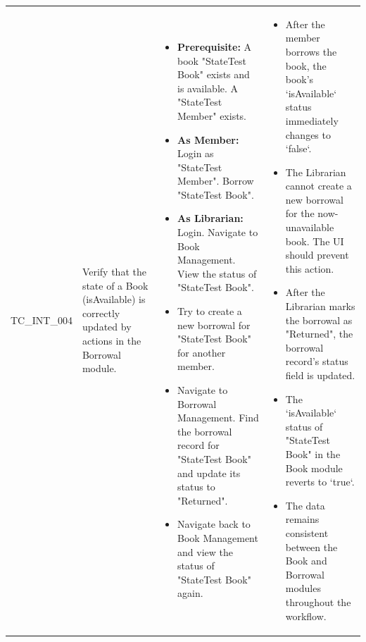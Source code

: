 \begin{longtable}{|>{\scriptsize\raggedright\arraybackslash}p{2cm}|>{\raggedright\arraybackslash}p{4cm}|>{\raggedright\arraybackslash}p{5cm}|>{\raggedright\arraybackslash}p{4.5cm}|}
\multicolumn{4}{|l|}{\textbf{Scenario: State Transitions Across Modules}} \\ \hline
TC\_INT\_004 & Verify that the state of a Book (isAvailable) is correctly updated by actions in the Borrowal module. & 
    \begin{itemize}[noitemsep, topsep=0pt, partopsep=0pt, leftmargin=*]
        \item \textbf{Prerequisite:} A book "StateTest Book" exists and is available. A "StateTest Member" exists.
        \item \textbf{As Member:} Login as "StateTest Member". Borrow "StateTest Book".
        \item \textbf{As Librarian:} Login. Navigate to Book Management. View the status of "StateTest Book".
        \item Try to create a new borrowal for "StateTest Book" for another member.
        \item Navigate to Borrowal Management. Find the borrowal record for "StateTest Book" and update its status to "Returned".
        \item Navigate back to Book Management and view the status of "StateTest Book" again.
    \end{itemize} & 
    \begin{itemize}[noitemsep, topsep=0pt, partopsep=0pt, leftmargin=*]
        \item After the member borrows the book, the book's `isAvailable` status immediately changes to `false`.
        \item The Librarian cannot create a new borrowal for the now-unavailable book. The UI should prevent this action.
        \item After the Librarian marks the borrowal as "Returned", the borrowal record's status field is updated.
        \item The `isAvailable` status of "StateTest Book" in the Book module reverts to `true`.
        \item The data remains consistent between the Book and Borrowal modules throughout the workflow.
    \end{itemize} \\ \hline


\end{longtable}
